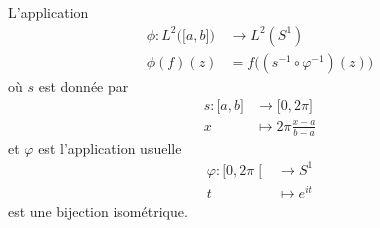 \begin{proposition}
    L'application
    \begin{equation}
        \begin{aligned}
            \phi\colon L^2\big( \mathopen[ a , b \mathclose] \big)&\to L^2(S^1) \\
            \phi(f)(z)&=f\big( (s^{-1}\circ \varphi^{-1})(z) \big)
        \end{aligned}
    \end{equation}
    où \( s\) est donnée par
    \begin{equation}
        \begin{aligned}
            s\colon \mathopen[ a , b \mathclose]&\to \mathopen[ 0 , 2\pi \mathclose] \\
            x&\mapsto 2\pi\frac{ x-a }{ b-a }
        \end{aligned}
    \end{equation}
    et \( \varphi\) est l'application usuelle
    \begin{equation}
        \begin{aligned}
            \varphi\colon \mathopen[ 0 , 2\pi \mathclose[&\to S^1 \\
                t&\mapsto  e^{it}
        \end{aligned}
    \end{equation}
    est une bijection isométrique.
\end{proposition}

